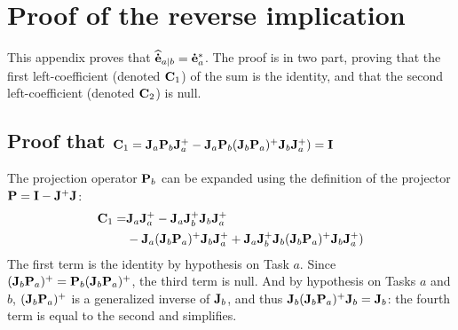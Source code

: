 \documentclass[journal]{IEEEtran}
\begin{document}

%
\FloatBarrier

\appendices
\section{Proof of the reverse implication}
\label{sec:appx}

This appendix proves that ${\mathbf{\widehat{\dot{e}}}}_{a|b} = {\mathbf{\dot{e}}}_{a}^*$. The proof is in two part, proving that the first left-coefficient (denoted ${\mathbf{C}}_1$) of the sum is the identity, and that the second left-coefficient (denoted ${\mathbf{C}}_2$) is null.

\subsection{Proof that ${\mathbf{C}}_1 = {\mathbf{J}}_{a} {\mathbf{P}}_{b} {\mathbf{J}}_{a}^+ - {\mathbf{J}}_{a} {\mathbf{P}}_{b} ({\mathbf{J}}_{b} {\mathbf{P}}_{a} )^+ {\mathbf{J}}_{b} {\mathbf{J}}_{a}^+) = {\mathbf{I}}$}
The projection operator ${\mathbf{P}}_{b}$ can be expanded using the definition of the projector ${\mathbf{P}} = {\mathbf{I}} - {\mathbf{J}}^+ {\mathbf{J}}$:
\begin{align*}
{\mathbf{C}}_1 =& {\mathbf{J}}_{a} {\mathbf{J}}_{a}^+ -   {\mathbf{J}}_{a} {\mathbf{J}}_{b}^+ {\mathbf{J}}_{b} {\mathbf{J}}_{a}^+ \\
&- {\mathbf{J}}_{a} ({\mathbf{J}}_{b} {\mathbf{P}}_{a} )^+ {\mathbf{J}}_{b} {\mathbf{J}}_{a}^+  + {\mathbf{J}}_{a} {\mathbf{J}}_{b}^+ {\mathbf{J}}_{b} ({\mathbf{J}}_{b} {\mathbf{P}}_{a} )^+ {\mathbf{J}}_{b} {\mathbf{J}}_{a}^+)
\end{align*}
The first term is the identity by hypothesis on Task $a$. Since $({\mathbf{J}}_{b} {\mathbf{P}}_{a} )^+ = {\mathbf{P}}_{b}({\mathbf{J}}_{b} {\mathbf{P}}_{a} )^+$, the third term is null. And by hypothesis on Tasks $a$ and $b$, $({\mathbf{J}}_{b} {\mathbf{P}}_{a} )^+$ is a generalized inverse of ${\mathbf{J}}_{b}$, and thus ${\mathbf{J}}_{b} ({\mathbf{J}}_{b} {\mathbf{P}}_{a} )^+ {\mathbf{J}}_{b} = {\mathbf{J}}_{b}$: the fourth term is equal to the second and simplifies. \QED
\end{document}

